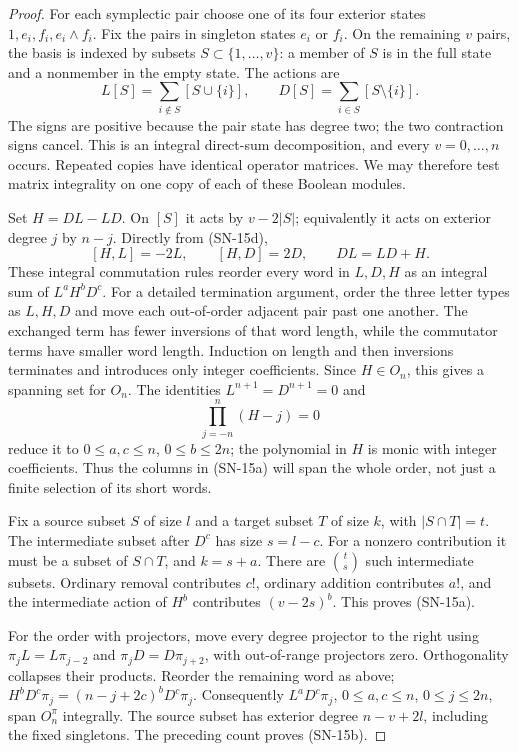 \begin{proof}
For each symplectic pair choose one of its four exterior states
$1,e_i,f_i,e_i\wedge f_i$. Fix the pairs in singleton states
$e_i$ or $f_i$. On the remaining $v$ pairs, the basis is indexed
by subsets $S\subset\{1,\ldots,v\}$: a member of $S$ is in the
full state and a nonmember in the empty state. The actions are
\[
 L[S]=\sum_{i\notin S}[S\cup\{i\}],\qquad
 D[S]=\sum_{i\in S}[S\setminus\{i\}].             \tag{SN-15d}
\]
The signs are positive because the pair state has degree two;
the two contraction signs cancel. This is an integral direct-sum
decomposition, and every $v=0,\ldots,n$ occurs. Repeated copies
have identical operator matrices. We may therefore test matrix
integrality on one copy of each of these Boolean modules.

Set $H=DL-LD$. On $[S]$ it acts by $v-2|S|$; equivalently it
acts on exterior degree $j$ by $n-j$. Directly from (SN-15d),
\[
 [H,L]=-2L,\qquad [H,D]=2D,\qquad DL=LD+H.
\]
These integral commutation rules reorder every word in $L,D,H$
as an integral sum of $L^aH^bD^c$. For a detailed termination
argument, order the three letter types as $L,H,D$ and move each
out-of-order adjacent pair past one another. The exchanged term
has fewer inversions of that word length, while the commutator
terms have smaller word length. Induction on length and then
inversions terminates and introduces only integer coefficients.
Since $H\in O_n$, this gives a spanning set for $O_n$.
The identities $L^{n+1}=D^{n+1}=0$ and
\[
 \prod_{j=-n}^{n}(H-j)=0
\]
reduce it to $0\le a,c\le n$, $0\le b\le2n$; the polynomial
in $H$ is monic with integer coefficients. Thus the columns in
(SN-15a) will span the whole order, not just a finite selection
of its short words.

Fix a source subset $S$ of size $l$ and a target subset $T$ of
size $k$, with $|S\cap T|=t$. The intermediate subset after
$D^c$ has size $s=l-c$. For a nonzero contribution it must be a
subset of $S\cap T$, and $k=s+a$. There are $\binom ts$ such
intermediate subsets. Ordinary removal contributes $c!$, ordinary
addition contributes $a!$, and the intermediate action of $H^b$
contributes $(v-2s)^b$. This proves (SN-15a).

For the order with projectors, move every degree projector to
the right using $\pi_jL=L\pi_{j-2}$ and
$\pi_jD=D\pi_{j+2}$, with out-of-range projectors zero.
Orthogonality collapses their products. Reorder the remaining
word as above; $H^bD^c\pi_j=(n-j+2c)^bD^c\pi_j$.
Consequently $L^aD^c\pi_j$, $0\le a,c\le n$,
$0\le j\le2n$, span $O_n^\pi$ integrally. The source subset
has exterior degree $n-v+2l$, including the fixed singletons.
The preceding count proves (SN-15b).


\end{proof}
